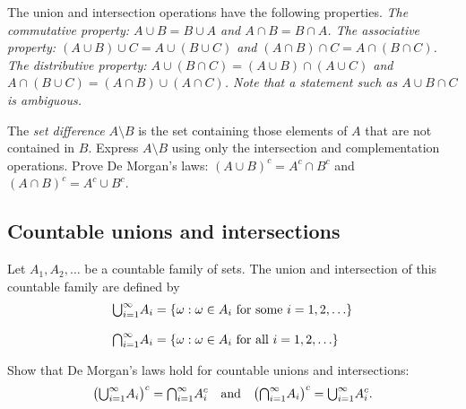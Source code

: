 
\begin{definition}
The union and intersection operations have the following properties.
\bit
\it The \emph{commutative} property: $A\cup B = B\cup A$ and $A\cap B = B\cap A$.
\it The \emph{associative} property: $(A\cup B)\cup C = A\cup (B\cup C)$ and $(A\cap B)\cap C = A\cap (B\cap C)$.
\it The \emph{distributive} property: $A\cup (B\cap C) = (A\cup B)\cap(A\cup C)$ and $A\cap (B\cup C) = (A\cap B)\cup(A\cap C)$.
\eit
Note that a statement such as $A\cup B\cap C$ is ambiguous. 
\end{definition}

\begin{exercise}
\begin{questions}
\question
The \emph{set difference} $A\setminus B$ is the set containing those elements of $A$ that are not contained in $B$. Express $A\setminus B$ using only the intersection and complementation operations.
\question
Prove De Morgan's laws: $(A\cup B)^c = A^c\cap B^c$ and $(A\cap B)^c = A^c\cup B^c$.
\end{questions}
\end{exercise}

\subsection{Countable unions and intersections}
Let $A_1,A_2,\ldots$ be a countable family of sets. The union and intersection of this countable family are defined by
\begin{align*}
{\textstyle\bigcup}_{i=1}^{\infty} A_i 
	& = \{\omega:\omega\in A_i\text{ for some } i=1,2,\ldots\} \\[2ex]
{\textstyle\bigcap}_{i=1}^{\infty} A_i 
	& = \{\omega:\omega\in A_i\text{ for all } i=1,2,\ldots\}
\end{align*}

\begin{exercise}
Show that De Morgan's laws hold for countable unions and intersections:
\[
\big({\textstyle\bigcup}_{i=1}^{\infty}A_i\big)^c = {\textstyle\bigcap}_{i=1}^{\infty}A_i^c
\quad\text{and}\quad
\big({\textstyle\bigcap}_{i=1}^{\infty}A_i\big)^c = {\textstyle\bigcup}_{i=1}^{\infty}A_i^c.
\]
\end{exercise}




